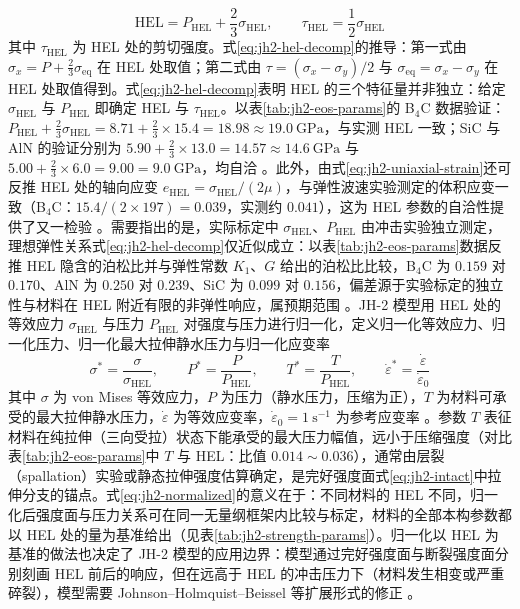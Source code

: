 \begin{equation}
  \mathrm{HEL}=P_{\mathrm{HEL}}+\frac{2}{3}\sigma_{\mathrm{HEL}},\qquad
  \tau_{\mathrm{HEL}}=\frac{1}{2}\sigma_{\mathrm{HEL}}
  \label{eq:jh2-hel-decomp}
\end{equation}
其中 $\tau_{\mathrm{HEL}}$ 为 HEL 处的剪切强度。式\eqref{eq:jh2-hel-decomp}的推导：第一式由 $\sigma_{x}=P+\tfrac{2}{3}\sigma_{\mathrm{eq}}$ 在 HEL 处取值；第二式由 $\tau=(\sigma_{x}-\sigma_{y})/2$ 与 $\sigma_{\mathrm{eq}}=\sigma_{x}-\sigma_{y}$ 在 HEL 处取值得到。式\eqref{eq:jh2-hel-decomp}表明 HEL 的三个特征量并非独立：给定 $\sigma_{\mathrm{HEL}}$ 与 $P_{\mathrm{HEL}}$ 即确定 HEL 与 $\tau_{\mathrm{HEL}}$。以表\ref{tab:jh2-eos-params}的 B$_{4}$C 数据验证：$P_{\mathrm{HEL}}+\tfrac{2}{3}\sigma_{\mathrm{HEL}}=8.71+\tfrac{2}{3}\times15.4=18.98\approx19.0~\mathrm{GPa}$，与实测 HEL 一致；SiC 与 AlN 的验证分别为 $5.90+\tfrac{2}{3}\times13.0=14.57\approx14.6~\mathrm{GPa}$ 与 $5.00+\tfrac{2}{3}\times6.0=9.00=9.0~\mathrm{GPa}$，均自洽 \cite{JohnsonHolmquist1994,HolmquistJohnson2002}。此外，由式\eqref{eq:jh2-uniaxial-strain}还可反推 HEL 处的轴向应变 $e_{\mathrm{HEL}}=\sigma_{\mathrm{HEL}}/(2\mu)$，与弹性波速实验测定的体积应变一致（B$_{4}$C：$15.4/(2\times197)=0.039$，实测约 $0.041$），这为 HEL 参数的自洽性提供了又一检验 \cite{JohnsonHolmquist1999}。需要指出的是，实际标定中 $\sigma_{\mathrm{HEL}}$、$P_{\mathrm{HEL}}$ 由冲击实验独立测定，理想弹性关系式\eqref{eq:jh2-hel-decomp}仅近似成立：以表\ref{tab:jh2-eos-params}数据反推 HEL 隐含的泊松比并与弹性常数 $K_{1}$、$G$ 给出的泊松比比较，B$_{4}$C 为 $0.159$ 对 $0.170$、AlN 为 $0.250$ 对 $0.239$、SiC 为 $0.099$ 对 $0.156$，偏差源于实验标定的独立性与材料在 HEL 附近有限的非弹性响应，属预期范围 \cite{JohnsonHolmquist1999,HolmquistJohnson2002}。JH-2 模型用 HEL 处的等效应力 $\sigma_{\mathrm{HEL}}$ 与压力 $P_{\mathrm{HEL}}$ 对强度与压力进行归一化，定义归一化等效应力、归一化压力、归一化最大拉伸静水压力与归一化应变率
\begin{equation}
  \sigma^{*}=\frac{\sigma}{\sigma_{\mathrm{HEL}}},\qquad
  P^{*}=\frac{P}{P_{\mathrm{HEL}}},\qquad
  T^{*}=\frac{T}{P_{\mathrm{HEL}}},\qquad
  \dot{\varepsilon}^{*}=\frac{\dot{\varepsilon}}{\dot{\varepsilon}_{0}}
  \label{eq:jh2-normalized}
\end{equation}
其中 $\sigma$ 为 von Mises 等效应力，$P$ 为压力（静水压力，压缩为正），$T$ 为材料可承受的最大拉伸静水压力，$\dot{\varepsilon}$ 为等效应变率，$\dot{\varepsilon}_{0}=1~\mathrm{s}^{-1}$ 为参考应变率 \cite{JohnsonHolmquist1994}。参数 $T$ 表征材料在纯拉伸（三向受拉）状态下能承受的最大压力幅值，远小于压缩强度（对比表\ref{tab:jh2-eos-params}中 $T$ 与 HEL：比值 $0.014\sim0.036$），通常由层裂（spallation）实验或静态拉伸强度估算确定，是完好强度面式\eqref{eq:jh2-intact}中拉伸分支的锚点。式\eqref{eq:jh2-normalized}的意义在于：不同材料的 HEL 不同，归一化后强度面与压力关系可在同一无量纲框架内比较与标定，材料的全部本构参数都以 HEL 处的量为基准给出（见表\ref{tab:jh2-strength-params}）。归一化以 HEL 为基准的做法也决定了 JH-2 模型的应用边界：模型通过完好强度面与断裂强度面分别刻画 HEL 前后的响应，但在远高于 HEL 的冲击压力下（材料发生相变或严重碎裂），模型需要 Johnson--Holmquist--Beissel 等扩展形式的修正 \cite{JohnsonHolmquistBeissel2003}。

